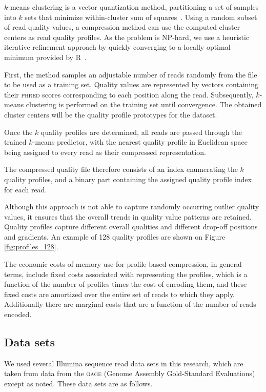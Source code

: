 $k$-means clustering is a vector quantization method, partitioning a
set of samples into $k$ sets that minimize within-cluster sum of
squares~\cite{macqueen1967some}. Using a random subset of read
quality values, a compression method can use the computed cluster
centers as read quality profiles. As the problem is NP-hard, we use a
heuristic iterative refinement approach by quickly converging to a
locally optimal minimum provided by R~\cite{hartigan1979algorithm}.

First, the method samples an adjustable number of reads
randomly from the file to be used as a training set. Quality values
are represented by vectors containing their \textsc{phred} scores
corresponding to each position along the read. Subsequently, $k$-means
clustering is performed on the training set until convergence. The
obtained cluster centers will be the quality profile prototypes for
the dataset.

Once the $k$ quality profiles are determined, all reads
are passed through the trained $k$-means predictor, with the nearest
quality profile in Euclidean space being assigned to every read
as their compressed representation.

The compressed quality file therefore consists of an index enumerating
the $k$ quality profiles, and a binary part containing the assigned
quality profile index for each read.

Although this approach is not able to capture randomly occurring
outlier quality values, it ensures that the overall trends in quality
value patterns are retained. Quality profiles capture different overall
qualities and different drop-off positions and gradients. An example
of 128 quality profiles are shown on Figure \ref{fig:profiles_128}.

The economic costs of memory use for profile-based compression, in
general terms, include fixed costs associated with representing the
profiles, which is a function of the number of profiles times the cost
of encoding them, and these fixed costs are amortized over the entire
set of reads to which they apply. Additionally there are marginal
costs that are a function of the number of reads encoded.

\subsection{Data sets}

We used several Illumina sequence read data sets in this research,
which are taken from data from the \textsc{gage} (Genome Assembly
Gold-Standard Evaluations)~\cite{Salzberg:2012rc} except as
noted. These data sets are as follows.

